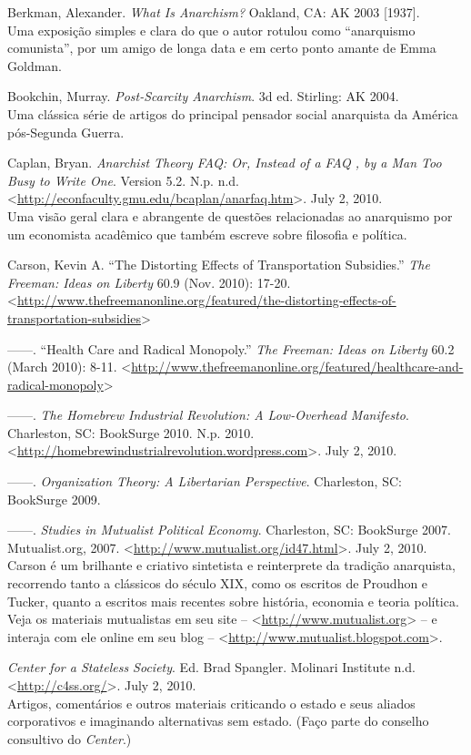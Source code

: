 \begin{hangparas}{0.25in}{1}
Berkman, Alexander. \emph{What Is Anarchism?} Oakland, CA: AK 2003 [1937].\smallskip\\
Uma exposição simples e clara do que o autor rotulou como ``anarquismo comunista'', por um amigo de longa data e em certo ponto amante de Emma Goldman.

Bookchin, Murray. \emph{Post-Scarcity Anarchism}. 3d ed. Stirling: AK 2004.\smallskip\\
Uma clássica série de artigos do principal pensador social anarquista da América pós-Segunda Guerra.

Caplan, Bryan. \emph{Anarchist Theory FAQ: Or, Instead of a FAQ , by a Man Too Busy to Write One}. Version 5.2. N.p. n.d. <\url{http://econfaculty.gmu.edu/bcaplan/anarfaq.htm}>. July 2, 2010.\smallskip\\
Uma visão geral clara e abrangente de questões relacionadas ao anarquismo por um economista acadêmico que também escreve sobre filosofia e política.

Carson, Kevin A. ``The Distorting Effects of Transportation Subsidies.'' \emph{The Freeman: Ideas on Liberty} 60.9 (Nov. 2010): 17-20. <\url{http://www.thefreemanonline.org/featured/the-distorting-effects-of-transportation-subsidies}>

------. ``Health Care and Radical Monopoly.'' \emph{The Freeman: Ideas on Liberty} 60.2 (March 2010): 8-11. <\url{http://www.thefreemanonline.org/featured/healthcare-and-radical-monopoly}>

------. \emph{The Homebrew Industrial Revolution: A Low-Overhead Manifesto}. Charleston, SC: BookSurge 2010. N.p. 2010. <\url{http://homebrewindustrialrevolution.wordpress.com}>. July 2, 2010.

------. \emph{Organization Theory: A Libertarian Perspective}. Charleston, SC: BookSurge 2009.

------. \emph{Studies in Mutualist Political Economy}. Charleston, SC: BookSurge 2007. Mutualist.org, 2007. <\url{http://www.mutualist.org/id47.html}>. July 2, 2010.\smallskip\\
Carson é um brilhante e criativo sintetista e reinterprete da tradição anarquista, recorrendo tanto a clássicos do século XIX, como os escritos de Proudhon e Tucker, quanto a escritos mais recentes sobre história, economia e teoria política. Veja os materiais mutualistas em seu site -- <\url{http://www.mutualist.org}> -- e interaja com ele online em seu blog -- <\url{http://www.mutualist.blogspot.com}>.

\emph{Center for a Stateless Society}. Ed. Brad Spangler. Molinari Institute n.d. <\url{http://c4ss.org/}>. July 2, 2010.\smallskip\\
Artigos, comentários e outros materiais criticando o estado e seus aliados corporativos e imaginando alternativas sem estado. (Faço parte do conselho consultivo do \emph{Center}.)


\end{hangparas}

